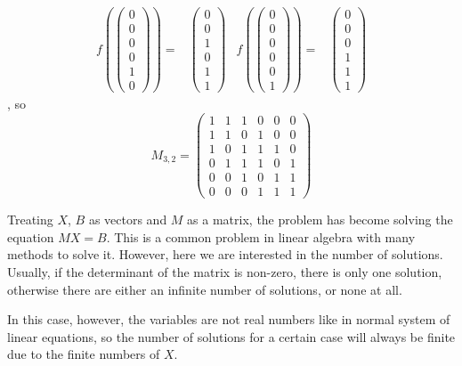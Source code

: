 \documentclass[a4paper, 12pt]{article}
\begin{document}
\begin{singlespace}
\begin{align*}
f\left(\begin{pmatrix}0\\0\\0\\0\\1\\0\end{pmatrix}\right) =&
\begin{pmatrix}0\\0\\1\\0\\1\\1\end{pmatrix}&
f\left(\begin{pmatrix}0\\0\\0\\0\\0\\1\end{pmatrix}\right) =&
\begin{pmatrix}0\\0\\0\\1\\1\\1\end{pmatrix}
\end{align*}
, so %
\begin{equation*}
M_{3,2}=\begin{pmatrix}
1&1&1&0&0&0\\
1&1&0&1&0&0\\
1&0&1&1&1&0\\
0&1&1&1&0&1\\
0&0&1&0&1&1\\
0&0&0&1&1&1
\end{pmatrix}
\end{equation*}
\end{singlespace}

Treating $X$, $B$ as vectors and $M$ as a matrix, the problem has become solving the equation $MX=B$. This is a common problem in linear algebra with many methods to solve it. However, here we are interested in the number of solutions. Usually, if the determinant of the matrix is non-zero, there is only one solution, otherwise there are either an infinite number of solutions, or none at all.

In this case, however, the variables are not real numbers like in normal system of linear equations, so the number of solutions for a certain case will always be finite due to the finite numbers of $X$. %
\end{document}
